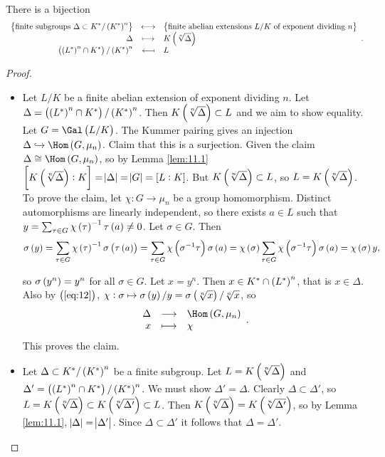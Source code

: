 \begin{theorem}
\label{thm:11.2}
There is a bijection
$$ \bijection{\cbr{\text{finite subgroups} \ \Delta \subset K^* / \br{K^*}^n}}{\cbr{\text{finite abelian extensions} \ L / K \ \text{of exponent dividing} \ n}}{\Delta}{K\br{\sqrt[n]{\Delta}}}{\br{\br{L^*}^n \cap K^*} / \br{K^*}^n}{L}. $$
\end{theorem}

\begin{proof}
\hfill
\begin{itemize}
\item Let $ L / K $ be a finite abelian extension of exponent dividing $ n $. Let $ \Delta = \br{\br{L^*}^n \cap K^*} / \br{K^*}^n $. Then $ K\br{\sqrt[n]{\Delta}} \subset L $ and we aim to show equality. Let $ G = \Gal\br{L / K} $. The Kummer pairing gives an injection $ \Delta \hookrightarrow \Hom\br{G, \mu_n} $. Claim that this is a surjection. Given the claim $ \Delta \cong \Hom\br{G, \mu_n} $, so by Lemma \ref{lem:11.1} $ \sbr{K\br{\sqrt[n]{\Delta}} : K} = \abs{\Delta} = \abs{G} = \sbr{L : K} $. But $ K\br{\sqrt[n]{\Delta}} \subset L $, so $ L = K\br{\sqrt[n]{\Delta}} $. To prove the claim, let $ \chi : G \to \mu_n $ be a group homomorphism. Distinct automorphisms are linearly independent, so there exists $ a \in L $ such that $ y = \sum_{\tau \in G} \chi\br{\tau}^{-1}\tau\br{a} \ne 0 $. Let $ \sigma \in G $. Then
\begin{equation}
\label{eq:12}
\sigma\br{y} = \sum_{\tau \in G} \chi\br{\tau}^{-1}\sigma\br{\tau\br{a}} = \sum_{\tau \in G} \chi\br{\sigma^{-1}\tau}\sigma\br{a} = \chi\br{\sigma}\sum_{\tau \in G} \chi\br{\sigma^{-1}\tau}\sigma\br{a} = \chi\br{\sigma}y,
\end{equation}

\pagebreak

so $ \sigma\br{y^n} = y^n $ for all $ \sigma \in G $. Let $ x = y^n $. Then $ x \in K^* \cap \br{L^*}^n $, that is $ x \in \Delta $. Also by $ \br{\ref{eq:12}} $, $ \chi : \sigma \mapsto \sigma\br{y} / y = \sigma\br{\sqrt[n]{x}} / \sqrt[n]{x} $, so
$$ \function{\Delta}{\Hom\br{G, \mu_n}}{x}{\chi}. $$
This proves the claim.
\item Let $ \Delta \subset K^* / \br{K^*}^n $ be a finite subgroup. Let $ L = K\br{\sqrt[n]{\Delta}} $ and $ \Delta' = \br{\br{L^*}^n \cap K^*} / \br{K^*}^n $. We must show $ \Delta' = \Delta $. Clearly $ \Delta \subset \Delta' $, so $ L = K\br{\sqrt[n]{\Delta}} \subset K\br{\sqrt[n]{\Delta'}} \subset L $. Then $ K\br{\sqrt[n]{\Delta}} = K\br{\sqrt[n]{\Delta'}} $, so by Lemma \ref{lem:11.1}, $ \abs{\Delta} = \abs{\Delta'} $. Since $ \Delta \subset \Delta' $ it follows that $ \Delta = \Delta' $.
\end{itemize}
\end{proof}

